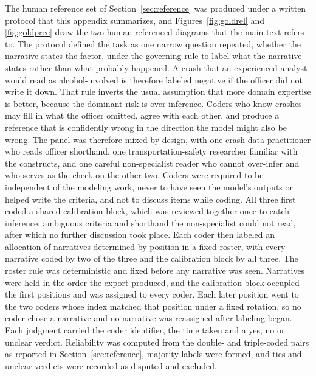 The human reference set of Section~\ref{sec:reference} was produced under a written protocol
that this appendix summarizes, and Figures~\ref{fig:goldrel} and \ref{fig:goldprec} draw the
two human-referenced diagrams that the main text refers to. The protocol defined the task as
one narrow question repeated, whether the narrative states the factor, under the governing
rule to label what the narrative states rather than what probably happened. A crash that an
experienced analyst would read as alcohol-involved is therefore labeled negative if the
officer did not write it down. That rule inverts the usual assumption that more domain
expertise is better, because the dominant risk is over-inference. Coders who know crashes
may fill in what the officer omitted, agree with each other, and produce a reference that is
confidently wrong in the direction the model might also be wrong. The panel was therefore
mixed by design, with one crash-data practitioner who reads officer shorthand, one
transportation-safety researcher familiar with the constructs, and one careful non-specialist
reader who cannot over-infer and who serves as the check on the other two. Coders were
required to be independent of the modeling work, never to have seen the model's outputs or
helped write the criteria, and not to discuss items while coding. All three first coded a
shared calibration block, which was reviewed together once to catch inference, ambiguous
criteria and shorthand the non-specialist could not read, after which no further discussion
took place. Each coder then labeled an allocation of narratives determined by position in a
fixed roster, with every narrative coded by two of the three and the calibration block by all
three. The roster rule was deterministic and fixed before any narrative was seen. Narratives
were held in the order the export produced, and the calibration block occupied the first
positions and was assigned to every coder. Each later position went to the two coders whose
index matched that position under a fixed rotation, so no coder chose a narrative and no
narrative was reassigned after labeling began. Each judgment carried the coder identifier, the
time taken and a yes, no or unclear verdict. Reliability was computed from the double- and
triple-coded pairs as reported in Section~\ref{sec:reference}, majority labels were formed, and
ties and unclear verdicts were recorded as disputed and excluded.

